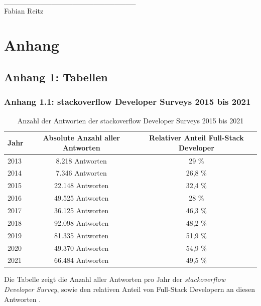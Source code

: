 \documentclass[a4paper]{scrartcl}
\begin{document}
\begin{tabbing}
	\_\_\_\_\_\_\_\_\_\_\_\_\_\_\_\_\_\_\_\_\_\_\_\_\_ \\
	Fabian Reitz
\end{tabbing}


\newpage

\appendix

\section*{Anhang}

\subsection*{Anhang 1: Tabellen}

\subsubsection*{Anhang 1.1: stackoverflow Developer Surveys 2015 bis 2021}

\begin{table}[H]
	\centering
	\caption{Anzahl der Antworten der stackoverflow Developer Surveys 2015 bis 2021}
	\begin{center}
		\begin{tabular}{| l | c | c |}
			\hline
			Jahr & Absolute Anzahl aller Antworten & Relativer Anteil Full-Stack Developer \\
			\hline \hline
			2013 & 8.218 Antworten & 29 \% \\
			\hline
			2014 & 7.346 Antworten & 26,8 \% \\
			\hline
			2015 & 22.148 Antworten & 32,4 \% \\
			\hline 
			2016 & 49.525 Antworten & 28 \% \\
			\hline 
			2017 & 36.125 Antworten & 46,3 \% \\
			\hline 
			2018 & 92.098 Antworten & 48,2 \% \\
			\hline
			2019 & 81.335 Antworten & 51,9 \% \\
			\hline
			2020 & 49.370 Antworten & 54,9 \% \\
			\hline
			2021 & 66.484 Antworten & 49,5 \% \\
			\hline
		\end{tabular}
	\end{center}
	Die Tabelle zeigt die Anzahl aller Antworten pro Jahr der \textit{stackoverflow Developer Survey}, sowie den relativen Anteil von Full-Stack Developern an diesen Antworten \autocite{stackoverflow_2015,stackoverflow_2016,stackoverflow_2017,stackoverflow_2018,stackoverflow_2019,stackoverflow_2020,stackoverflow_2021}.
\end{table}
\end{document}
